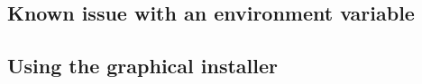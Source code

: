 

\subsection{Known issue with an environment variable}


\subsection{Using the graphical installer}

